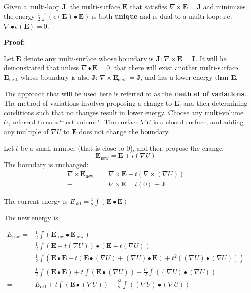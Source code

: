 \begin{thm}\label{thm:low_energy_surface}
Given a multi-loop \(\mathbf{J}\), the multi-surface \(\mathbf{E}\) that satisfies \(\nabla \times \mathbf{E} = \mathbf{J}\) and minimizes the energy \(\frac{1}{2}\int (\epsilon(\mathbf{E}) \bullet \mathbf{E})\) is both {\bf unique} and is dual to a multi-loop: i.e. \(\nabla \bullet \epsilon(\mathbf{E}) = 0\). 
\end{thm}
\textbf{Proof:}

Let \(\mathbf{E}\) denote any multi-surface whose boundary is \(\mathbf{J}\): \(\nabla \times \mathbf{E} = \mathbf{J}\). It will be demonstrated that unless \(\nabla \bullet \mathbf{E} = 0\), that there will exist another multi-surface \(\mathbf{E}_{\text{next}}\) whose boundary is also \(\mathbf{J}\): \(\nabla \times \mathbf{E}_{\text{next}} = \mathbf{J}\), and has a lower energy than \(\mathbf{E}\). 

The approach that will be used here is referred to as the {\bf method of variations}. The method of variations involves proposing a change to \(\mathbf{E}\), and then determining conditions such that no changes result in lower energy. Choose any multi-volume \(U\), referred to as a ``test volume". The surface \(\nabla U\) is a closed surface, and adding any multiple of \(\nabla U\) to \(\mathbf{E}\) does not change the boundary.

Let \(t\) be a small number (that is close to 0), and then propose the change:
\[\mathbf{E}_{\text{new}} = \mathbf{E} + t(\nabla U)\]
The boundary is unchanged:
\begin{align*}
\nabla \times \mathbf{E}_{\text{new}} = & \nabla \times \mathbf{E} + t(\nabla \times (\nabla U)) \\ 
= & \nabla \times \mathbf{E} - t(0) 
= \mathbf{J}
\end{align*}

The current energy is \(E_{\text{old}} = \frac{1}{2}\int (\mathbf{E} \bullet \mathbf{E})\)

The new energy is: 

\begin{align*}
E_{\text{new}} = & \frac{1}{2}\int (\mathbf{E}_{\text{new}} \bullet \mathbf{E}_{\text{new}}) \\ 
= & \frac{1}{2}\int (\mathbf{E} + t (\nabla U)) \bullet (\mathbf{E} + t (\nabla U)) \\ 
= & \frac{1}{2}\int (\mathbf{E} \bullet \mathbf{E} + t(\mathbf{E} \bullet (\nabla U) + (\nabla U) \bullet \mathbf{E}) + t^2((\nabla U) \bullet (\nabla U))) \\
= & \frac{1}{2}\int (\mathbf{E} \bullet \mathbf{E}) + t\int (\mathbf{E} \bullet (\nabla U)) + \frac{t^2}{2}\int ((\nabla U) \bullet (\nabla U)) \\ 
= & E_{\text{old}} + t\int (\mathbf{E} \bullet (\nabla U)) + \frac{t^2}{2}\int ((\nabla U) \bullet (\nabla U))
\end{align*}

